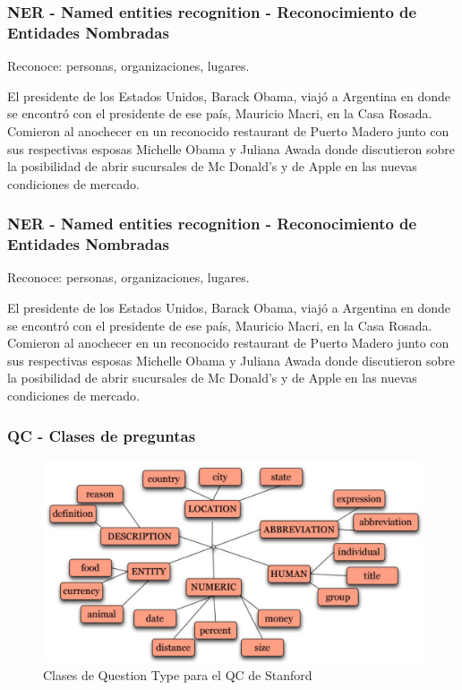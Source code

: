 \fontsize{9.5pt}{9.2}\selectfont

\begin{frame}
  \frametitle{NER - Named entities recognition - Reconocimiento de Entidades Nombradas}
  Reconoce: personas, organizaciones, lugares. \newline

  El presidente de los Estados Unidos, Barack Obama, viajó a Argentina en donde se encontró con el presidente de ese país, Mauricio Macri, en la Casa Rosada. Comieron al anochecer en un reconocido restaurant de Puerto Madero junto con sus respectivas esposas Michelle Obama y Juliana Awada donde discutieron sobre la posibilidad de abrir sucursales de Mc Donald's y de Apple en las nuevas condiciones de mercado.
\end{frame}


\begin{frame}
  \frametitle{NER - Named entities recognition - Reconocimiento de Entidades Nombradas}
  Reconoce: {\color{red}personas}, {\color{blue}organizaciones}, {\color{green}lugares}. \newline

  El presidente de los {\color{green}Estados Unidos}, {\color{red}Barack Obama}, viajó a {\color{green}Argentina} en donde se encontró con el presidente de ese país, {\color{red}Mauricio Macri}, en la {\color{blue}Casa Rosada}. Comieron al anochecer en un reconocido restaurant de {\color{green}Puerto Madero} junto con sus respectivas esposas {\color{red}Michelle Obama} y {\color{red}Juliana Awada} donde discutieron sobre la posibilidad de abrir sucursales de {\color{blue}Mc Donald's} y de {\color{blue}Apple} en las nuevas condiciones de mercado.
\end{frame}

\begin{frame}
  \frametitle{QC - Clases de preguntas}
  \begin{figure}
      \includegraphics[scale=0.4]{graficos/li-roth-qc-classes}
    \caption{Clases de Question Type para el QC de Stanford}
    \label{fig:tareas}
  \end{figure}
\end{frame}



